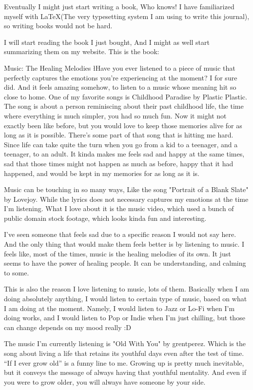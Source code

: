 \documentclass{novella}
\begin{document}
Eventually I might just start writing a book, Who knows! I have familiarized myself with \LaTeX (The very typesetting system I am using to write this journal), so writing books would not be hard.

I will start reading the book I just bought, And I might as well start summarizing them on my website. This is the book:


\h{Music: The Healing Melodies}
\l{H}ave you ever listened to a piece of music that perfectly captures the emotions you're experiencing at the moment? I for sure did. And it feels amazing somehow, to listen to a music whose meaning hit so close to home. One of my favorite songs is Childhood Paradise by Plastic Plastic. The song is about a person reminiscing about their past childhood life, the time where everything is much simpler, you had so much fun. Now it might not exactly been like before, but you would love to keep those memories alive for as long as it is possible. There's some part of that song that is hitting me hard. Since life can take quite the turn when you go from a kid to a teenager, and a teenager, to an adult. It kinda makes me feels sad and happy at the same times, sad that those times might not happen as much as before, happy that it had happened, and would be kept in my memories for as long as it is.

Music can be touching in so many ways, Like the song "Portrait of a Blank Slate" by Lovejoy. While the lyrics does not necessary captures my emotions at the time I'm listening. What I love about it is the music video, which used a bunch of public domain stock footage, which looks kinda fun and interesting.

I've seen someone that feels sad due to a specific reason I would not say here. And the only thing that would make them feels better is by listening to music. I feels like, most of the times, music is the healing melodies of its own. It just seems to have the power of healing people. It can be understanding, and calming to some.

This is also the reason I love listening to music, lots of them. Basically when I am doing absolutely anything, I would listen to certain type of music, based on what I am doing at the moment. Namely, I would listen to Jazz or Lo-Fi when I'm doing works, and I would listen to Pop or Indie when I'm just chilling, but those can change depends on my mood really :D

The music I'm currently listening is "Old With You" by grentperez. Which is the song about living a life that retains its youthful days even after the test of time. “If I ever grow old” is a funny line to me. Growing up is pretty much inevitable, but it conveys the message of always having that youthful mentality. And even if you were to grow older, you will always have someone by your side.
\end{document}
